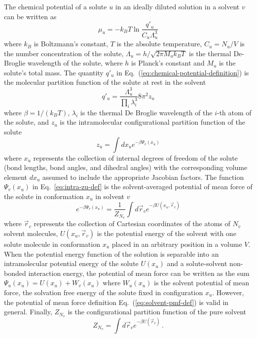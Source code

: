 \documentclass[9pt,bestpractices]{livecoms}
\begin{document}
The chemical potential of a solute $u$ in an ideally diluted solution in a solvent $v$ can be written as~\cite{guggenheim1952mixtures504,gilson1997statisticalthermodynamic,gilson2007calculation}
\begin{equation}
  \mu_u = -k_B T \ln \frac{q'_u}{C_u \Lambda_u^3}
  \label{eq:chemical-potential-definition}
\end{equation}
where $k_B$ is Boltzmann's constant, $T$ is the absolute temperature, $C_u = N_u/V$ is the number concentration of the solute, $\Lambda_u = h/\sqrt{2 \pi M_u k_B T}$ is the thermal De-Broglie wavelength of the solute, where $h$ is Planck's constant and $M_u$ is the solute's total mass. The quantity $q'_u$ in Eq.~(\ref{eq:chemical-potential-definition}) is the molecular partition function of the solute at rest in the solvent
\begin{equation}
  q'_u = \frac{\Lambda_u^3}{\prod_i \lambda_i^3} 8 \pi^2 z_u
  \label{eq:intra-qpu-def}
\end{equation}
where $\beta = 1/(k_B T)$, $\lambda_i$ is the thermal De Broglie wavelength of the $i$-th atom of the solute, and $z_u$ is the intramolecular configurational partition function of the solute
\begin{equation}
  z_u = \int dx_u e^{-\beta \Psi_v(x_u)}
  \label{eq:intra-zu-def}
\end{equation}
where $x_u$ represents the collection of internal degrees of freedom of the solute (bond lengths, bond angles, and dihedral angles) with the corresponding volume element $dx_u$ assumed to include the appropriate Jacobian factors. The function $\Psi_v(x_u)$ in Eq.~\ref{eq:intra-zu-def} is the solvent-averaged potential of mean force of the solute in conformation $x_u$ in solvent $v$\cite{rouxandsimonson1999solventmodels} 
\begin{equation}
  e^{-\beta \Psi_v(x_u)} = \frac{1}{Z_{N_v}} \int d\vec{r}_v e^{-\beta U(x_u, \vec{r}_v)}
  \label{eq:solvent-pmf-def}
\end{equation}
where $\vec{r}_v$ represents the collection of Cartesian coordinates of the atoms of $N_v$ solvent molecules, $U(x_u, \vec{r}_v)$ is the potential energy of the solvent with one solute molecule in conformation $x_u$ placed in an arbitrary position in a volume $V$. When the potential energy function of the solution is separable into an intramolecular potential energy of the solute $U(x_u)$ and a solute-solvent non-bonded interaction energy, the potential of mean force can be written as the sum $\Psi_u(x_u) = U(x_u) + W_v(x_u)$ where $W_u(x_u)$ is the solvent potential of mean force, the solvation free energy of the solute fixed in configuration $x_u$.\cite{gilson2007calculation} However, the potential of mean force definition Eq.~(\ref{eq:solvent-pmf-def}) is valid in general. Finally, $Z_{N_v}$ is the configurational partition function of the pure solvent
\begin{equation}
  Z_{N_v} = \int d\vec{r}_v e^{-\beta U(\vec{r}_v)} \, .
  \label{eq:Z-pure-solvent}
\end{equation}
\end{document}
